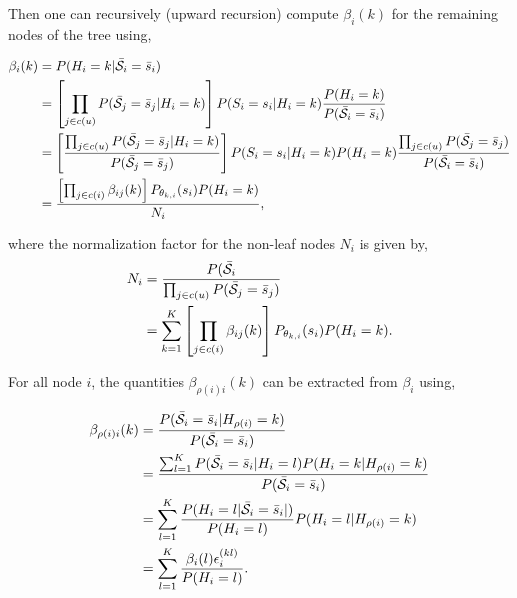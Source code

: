 \documentclass[a4paper,11pt]{report}
\begin{document}
{				Then one can recursively (upward recursion) compute $\beta_{i}(k)$ for the remaining nodes of the tree using,
				
				\begin{equation}
					\begin{split}
						\beta_{i}(k)	&= P(H_{i}=k | \bar{\mathcal{S}}_{i}= \bar{s}_{i})\\
													&= \left[ \prod_{j \in c(u)} P(\bar{\mathcal{S}}_{j}= \bar{s}_{j} | H_{i}=k) \right] P(S_{i}= s_{i} | H_{i}=k) \frac{P(H_{i}=k)} {P(\bar{\mathcal{S}}_{i}= \bar{s}_{i})}\\
													&= \left[ \frac{\prod_{j \in c(u)} P(\bar{\mathcal{S}}_{j}= \bar{s}_{j} | H_{i}=k)} {P(\bar{\mathcal{S}}_{j}= \bar{s}_{j})} \right]
														P(S_{i}= s_{i} | H_{i}=k) P(H_{i}=k) 
														\frac{\prod_{j \in c(u)} P(\bar{\mathcal{S}}_{j}= \bar{s}_{j})} {P(\bar{\mathcal{S}}_{i}= \bar{s}_{i})}\\
													&= \frac{ \left[ \prod_{j \in c(i)} \beta_{ij}(k) \right] P_{\theta_{k,i}}(s_{i})P(H_{i}=k)}{N_{i}},
						\end{split}
						\label{eq:upward beta node}
				\end{equation}
				
				where the normalization factor for the non-leaf nodes $N_{i}$ is given by,
				\begin{equation}
					\begin{split}
						N_{i}	&= \frac{P(\bar{\mathcal{S}}_{i}}{\prod_{j \in c(u)} P(\bar{\mathcal{S}}_{j}= \bar{s}_{j})}\\
									&= \sum_{k=1}^{K} \left[ \prod_{j \in c(i)} \beta_{ij}(k) \right]  P_{\theta_{k,i}}(s_{i})P(H_{i}=k).
					\end{split}
					\label{eq:upward normalization others}
				\end{equation}

				For all node $i$, the quantities $\beta_{\rho(i)i}(k)$ can be extracted from $\beta_{i}$ using,
				
				\begin{equation}
					\begin{split}
						\beta_{\rho(i)i}(k)	&= \frac{P(\bar{\mathcal{S}}_{i}= \bar{s}_{i} | H_{\rho(i)}=k)} {P(\bar{\mathcal{S}}_{i}= \bar{s}_{i}) }\\
																&= \frac{ \sum_{l=1}^{K} P(\bar{\mathcal{S}}_{i}= \bar{s}_{i} | H_{i}=l) P(H_{i}= k | H_{\rho(i)}=k)} {P(\bar{\mathcal{S}}_{i}= \bar{s}_{i}) }\\
																&= \sum_{l=1}^{K} \frac{ P(H_{i}=l | \bar{\mathcal{S}}_{i}= \bar{s}_{i} |)}{P(H_{i}=l)} P(H_{i}= l | H_{\rho(i)}=k)\\
																&= \sum_{l=1}^{K} \frac{\beta_{i}(l) \epsilon_{i}^{(kl)}}{P(H_{i}=l)}.
						\end{split}
						\label{eq:upward beta node and parents}
				\end{equation}
				
}
\end{document}
